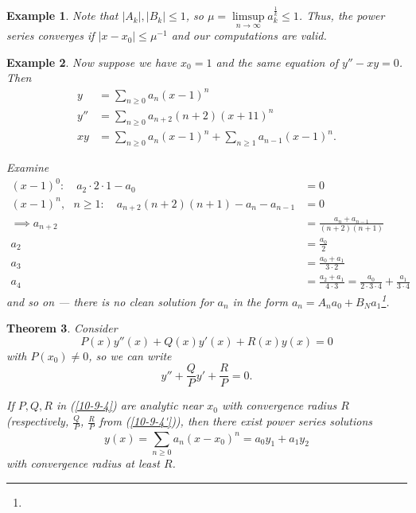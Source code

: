 \documentclass{tufte-handout}
\newtheorem{thm}{Theorem}[subsection]
\newtheorem{ex}[thm]{Example}
\theoremstyle{definition}
\begin{document}
\begin{ex}
	Note that $\left| A_k \right|, \left| B_k \right| \le 1$, so $\mu = \limsup\limits_{n \to \infty} a_k^{\frac{1}{k}} \le 1$. Thus, the power series converges if $\left| x - x_0 \right| \le \mu^{-1}$ and our computations are valid.

\end{ex}

\begin{ex}
	Now suppose we have $x_0 = 1$ and the same equation of $y'' - xy = 0$. 
	Then
	\begin{align*}
		y &= \sum\limits_{n\ge 0}^{} a_n (x-1)^{n} \\ 
		y'' &=  \sum\limits_{n\ge 0}^{} a_{n+2} (n+2) (x+11)^{n} \\
		xy &= \sum\limits_{n \ge 0}^{} a_n (x-1)^{n} + \sum\limits_{n \ge 1}^{} a_{n-1} (x-1)^{n}
	.\end{align*}

	Examine
	\begin{align*}
		(x-1)^{0}: \quad a_2 \cdot 2 \cdot 1 - a_0 &= 0 \\
		(x-1)^{n}, \text{ } n \ge 1: \quad a_{n+2} (n+2)(n+1) - a_n - a_{n-1} &= 0 \\
		\implies a_{n+2} &= \frac{a_n + a_{n-1}}{(n+2)(n+1)} \\
		a_2 &= \frac{a_0}{2} \\
		a_3 &= \frac{a_0 + a_1}{3 \cdot 2} \\
		a_4 &= \frac{a_2 + a_1}{4 \cdot 3} = \frac{a_0}{2 \cdot 3 \cdot 4} + \frac{a_1}{3\cdot 4}
	\end{align*}
	and so on --- there is no clean solution for $a_n$ in the form $a_n = A_n a_0 + B_N a_1$\footnote{}.
\end{ex}

\begin{thm}
	Consider
	\begin{equation}
		P(x) y''(x) + Q(x) y'(x) + R(x) y(x) = 0 \label{10-9-4}
	\end{equation}
	with $P(x_0) \ne 0$, so we can write 
	\begin{equation}
		y'' + \frac{Q}{P} y' + \frac{R}{P} = 0 \label{10-9-4'}.
	\end{equation}

	If $P,Q,R$ in (\ref{10-9-4}) are analytic near $x_0$ with convergence radius $R$ (respectively, $\frac{Q}{P}$, $\frac{R}{P}$ from (\ref{10-9-4'})), then there exist power series solutions \[
		y(x) = \sum\limits_{n\ge 0}^{} a_n (x-x_0)^{n} = a_0 y_1 + a_1 y_2
	\] with convergence radius at least $R$.
\end{thm}
\end{document}
